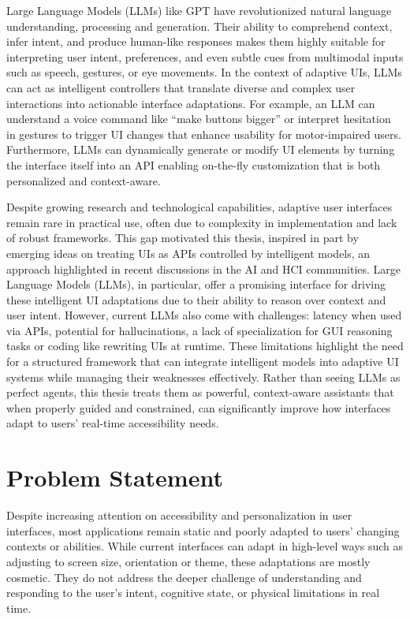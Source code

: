 \documentclass[openany]{book}
\begin{document}
Large Language Models (LLMs) like GPT have revolutionized natural language understanding, processing and generation. Their ability to comprehend context, infer intent, and produce human-like responses makes them highly suitable for interpreting user intent, preferences, and even subtle cues from multimodal inputs such as speech, gestures, or eye movements.
In the context of adaptive UIs, LLMs can act as intelligent controllers that translate diverse and complex user interactions into actionable interface adaptations. For example, an LLM can understand a voice command like “make buttons bigger” or interpret hesitation in gestures to trigger UI changes that enhance usability for motor-impaired users. Furthermore, LLMs can dynamically generate or modify UI elements by turning the interface itself into an API enabling on-the-fly customization that is both personalized and context-aware.

Despite growing research and technological capabilities, adaptive user interfaces remain rare in practical use, often due to complexity in implementation and lack of robust frameworks. This gap motivated this thesis, inspired in part by emerging ideas on treating UIs as APIs controlled by intelligent models, an approach highlighted in recent discussions in the AI and HCI communities. Large Language Models (LLMs), in particular, offer a promising interface for driving these intelligent UI adaptations due to their ability to reason over context and user intent. However, current LLMs also come with challenges: latency when used via APIs, potential for hallucinations, a lack of specialization for GUI reasoning tasks or coding like rewriting UIs at runtime. These limitations highlight the need for a structured framework that can integrate intelligent models into adaptive UI systems while managing their weaknesses effectively. Rather than seeing LLMs as perfect agents, this thesis treats them as powerful, context-aware assistants that when properly guided and constrained, can significantly improve how interfaces adapt to users' real-time accessibility needs.

\section{Problem Statement}
Despite increasing attention on accessibility and personalization in user interfaces, most applications remain static and poorly adapted to users' changing contexts or abilities. While current interfaces can adapt in high-level ways such as adjusting to screen size, orientation or theme, these adaptations are mostly cosmetic. They do not address the deeper challenge of understanding and responding to the user's intent, cognitive state, or physical limitations in real time.
\end{document}
